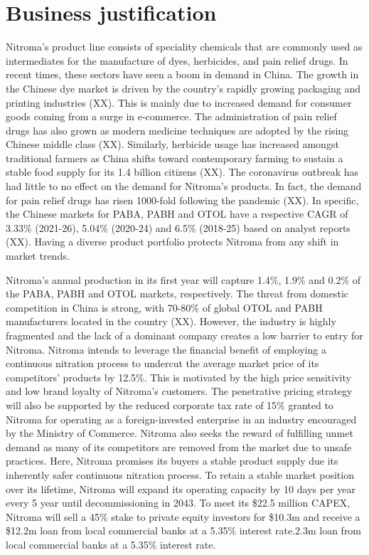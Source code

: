 \section*{Business justification}


Nitroma’s product line consists of speciality chemicals that are commonly used as intermediates for the manufacture of dyes, herbicides, and pain relief drugs. In recent times, these sectors have seen a boom in demand in China. The growth in the Chinese dye market is driven by the country’s rapidly growing packaging and printing industries (XX). This is mainly due to increased demand for consumer goods coming from a surge in e-commerce. The administration of pain relief drugs has also grown as modern medicine techniques are adopted by the rising Chinese middle class (XX). Similarly, herbicide usage has increased amongst traditional farmers as China shifts toward contemporary farming to sustain a stable food supply for its 1.4 billion citizens (XX). The coronavirus outbreak has had little to no effect on the demand for Nitroma’s products. In fact, the demand for pain relief drugs has risen 1000-fold following the pandemic (XX). In specific, the Chinese markets for PABA, PABH and OTOL have a respective CAGR of 3.33\% (2021-26), 5.04\% (2020-24) and 6.5\% (2018-25) based on analyst reports (XX). Having a diverse product portfolio protects Nitroma from any shift in market trends.

Nitroma’s annual production in its first year will capture 1.4\%, 1.9\% and 0.2\% of the PABA, PABH and OTOL markets, respectively. The threat from domestic competition in China is strong, with 70-80\% of global OTOL and PABH manufacturers located in the country (XX). However, the industry is highly fragmented and the lack of a dominant company creates a low barrier to entry for Nitroma. Nitroma intends to leverage the financial benefit of employing a continuous nitration process to undercut the average market price of its competitors’ products by 12.5\%. This is motivated by the high price sensitivity and low brand loyalty of Nitroma’s customers. The penetrative pricing strategy will also be supported by the reduced corporate tax rate of 15\% granted to Nitroma for operating as a foreign-invested enterprise in an industry encouraged by the Ministry of Commerce. Nitroma also seeks the reward of fulfilling unmet demand as many of its competitors are removed from the market due to unsafe practices. Here, Nitroma promises its buyers a stable product supply due its inherently safer continuous nitration process. To retain a stable market position over its lifetime, Nitroma will expand its operating capacity by 10 days per year every 5 year until decommissioning in 2043. To meet its \$22.5 million CAPEX, Nitroma will sell a 45\% stake to private equity investors for \$10.3m and receive a \$12.2m loan from local commercial banks at a 5.35\% interest rate.2.3m loan from local commercial banks at a 5.35\% interest rate.

